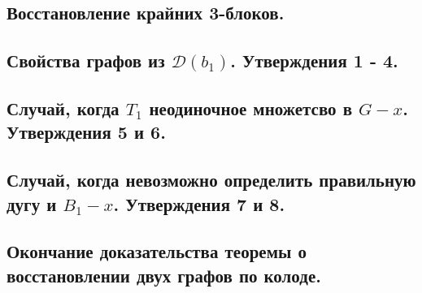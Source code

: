 \subsection{Восстановление крайних 3-блоков.}

\subsection{Свойства графов из $\mathcal D(b_1)$. Утверждения 1 - 4.}

\subsection{Случай, когда $T_1$ неодиночное множетсво в $G - x$. Утверждения 5 и 6.}

\subsection{Случай, когда невозможно определить правильную дугу и $B_1 - x$. Утверждения 7 и 8.}

\subsection{Окончание доказательства теоремы о восстановлении двух графов по колоде.}
